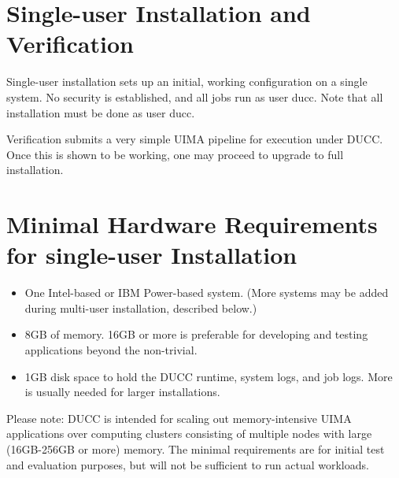 \section{Single-user  Installation and Verification}

Single-user installation sets up an initial, working configuration on a single system.  No security
is established, and all jobs run as user ducc.  Note that all installation must be done as user ducc.

Verification submits a very simple UIMA pipeline for execution under DUCC.  Once this is shown to be
working, one may proceed to upgrade to full installation.


\section{Minimal Hardware Requirements for single-user Installation}
\begin{itemize}
    \item One Intel-based or IBM Power-based system.  (More systems may be added during multi-user
      installation, described below.)

    \item 8GB of memory.  16GB or more is preferable for developing and testing applications beyond
      the non-trivial.  

    \item 1GB disk space to hold the DUCC runtime, system logs, and job logs.  More is
      usually needed for larger installations.  
\end{itemize}

Please note: DUCC is intended for scaling out memory-intensive UIMA applications over computing
clusters consisting of multiple nodes with large (16GB-256GB or more) memory.  The minimal
requirements are for initial test and evaluation purposes, but will not be sufficient to run actual
workloads.

